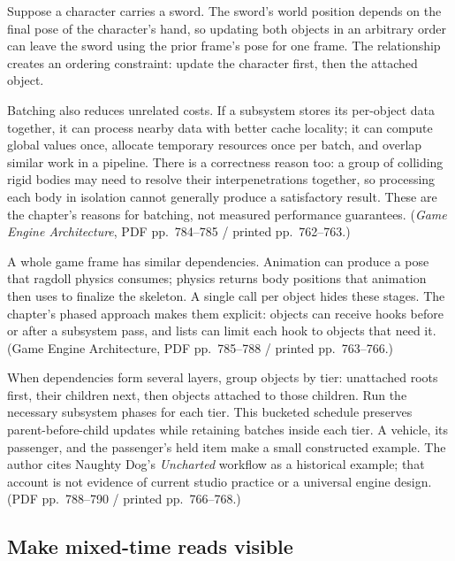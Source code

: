 \hypertarget{05-engine-i-ch014-let-dependencies-set-the-update-order}{}

Suppose a character carries a sword. The sword's world position depends on the final pose of the character's hand, so updating both objects in an arbitrary order can leave the sword using the prior frame's pose for one frame. The relationship creates an ordering constraint: update the character first, then the attached object.

Batching also reduces unrelated costs. If a subsystem stores its per-object data together, it can process nearby data with better cache locality; it can compute global values once, allocate temporary resources once per batch, and overlap similar work in a pipeline. There is a correctness reason too: a group of colliding rigid bodies may need to resolve their interpenetrations together, so processing each body in isolation cannot generally produce a satisfactory result. These are the chapter's reasons for batching, not measured performance guarantees. (\emph{Game Engine Architecture}, PDF pp.~784--785 / printed pp.~762--763.)

A whole game frame has similar dependencies. Animation can produce a pose that ragdoll physics consumes; physics returns body positions that animation then uses to finalize the skeleton. A single  call per object hides these stages. The chapter's phased approach makes them explicit: objects can receive hooks before or after a subsystem pass, and lists can limit each hook to objects that need it. (Game Engine Architecture, PDF pp.~785--788 / printed pp.~763--766.)

When dependencies form several layers, group objects by tier: unattached roots first, their children next, then objects attached to those children. Run the necessary subsystem phases for each tier. This bucketed schedule preserves parent-before-child updates while retaining batches inside each tier. A vehicle, its passenger, and the passenger's held item make a small constructed example. The author cites Naughty Dog's \emph{Uncharted} workflow as a historical example; that account is not evidence of current studio practice or a universal engine design. (PDF pp.~788--790 / printed pp.~766--768.)

\subsection{Make mixed-time reads visible}\label{05-engine-i-ch014-make-mixed-time-reads-visible}

